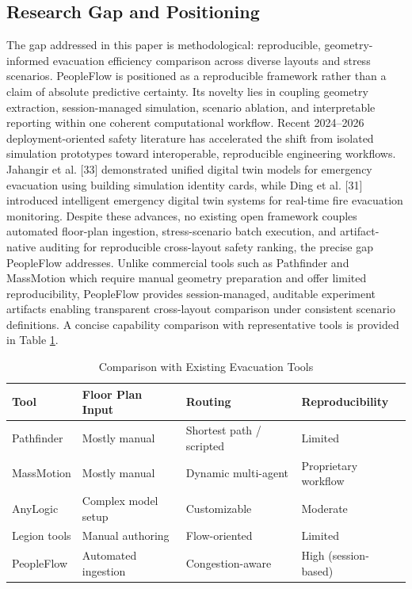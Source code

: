 \documentclass[journal]{IEEEtran}
\begin{document}
\subsection{Research Gap and Positioning}
The gap addressed in this paper is methodological: reproducible, geometry-informed evacuation efficiency comparison across diverse layouts and stress scenarios. PeopleFlow is positioned as a reproducible framework rather than a claim of absolute predictive certainty. Its novelty lies in coupling geometry extraction, session-managed simulation, scenario ablation, and interpretable reporting within one coherent computational workflow.
Recent 2024--2026 deployment-oriented safety literature has accelerated the shift from isolated simulation prototypes toward interoperable, reproducible engineering workflows. Jahangir et al. [33] demonstrated unified digital twin models for emergency evacuation using building simulation identity cards, while Ding et al. [31] introduced intelligent emergency digital twin systems for real-time fire evacuation monitoring. Despite these advances, no existing open framework couples automated floor-plan ingestion, stress-scenario batch execution, and artifact-native auditing for reproducible cross-layout safety ranking, the precise gap PeopleFlow addresses. Unlike commercial tools such as Pathfinder and MassMotion which require manual geometry preparation and offer limited reproducibility, PeopleFlow provides session-managed, auditable experiment artifacts enabling transparent cross-layout comparison under consistent scenario definitions.
A concise capability comparison with representative tools is provided in Table \ref{tab:tool_comparison}.

\begin{table}[t]
\centering
\caption{Comparison with Existing Evacuation Tools}
\label{tab:tool_comparison}
{\scriptsize
\setlength{\tabcolsep}{3pt}
\begin{tabular}{>{\raggedright\arraybackslash}p{1.60cm} >{\raggedright\arraybackslash}p{1.20cm} >{\raggedright\arraybackslash}p{1.95cm} >{\raggedright\arraybackslash}p{2.00cm}}
\toprule
Tool & Floor Plan Input & Routing & Reproducibility \\
\midrule
Pathfinder & Mostly manual & Shortest path / scripted & Limited \\
MassMotion & Mostly manual & Dynamic multi-agent & Proprietary workflow \\
AnyLogic & Complex model setup & Customizable & Moderate \\
Legion tools & Manual authoring & Flow-oriented & Limited \\
PeopleFlow & Automated ingestion & Congestion-aware & High (session-based) \\
\bottomrule
\end{tabular}
}
\end{table}
\end{document}
